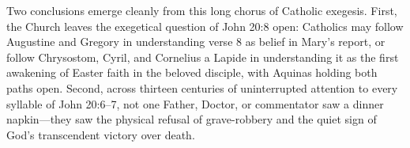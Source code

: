 Two conclusions emerge cleanly from this long chorus of Catholic exegesis. First, the Church leaves the exegetical question of John 20:8 open: Catholics may follow Augustine and Gregory in understanding verse 8 as belief in Mary's report, or follow Chrysostom, Cyril, and Cornelius a Lapide in understanding it as the first awakening of Easter faith in the beloved disciple, with Aquinas holding both paths open. Second, across thirteen centuries of uninterrupted attention to every syllable of John 20:6--7, not one Father, Doctor, or commentator saw a dinner napkin---they saw the physical refusal of grave-robbery and the quiet sign of God's transcendent victory over death.
